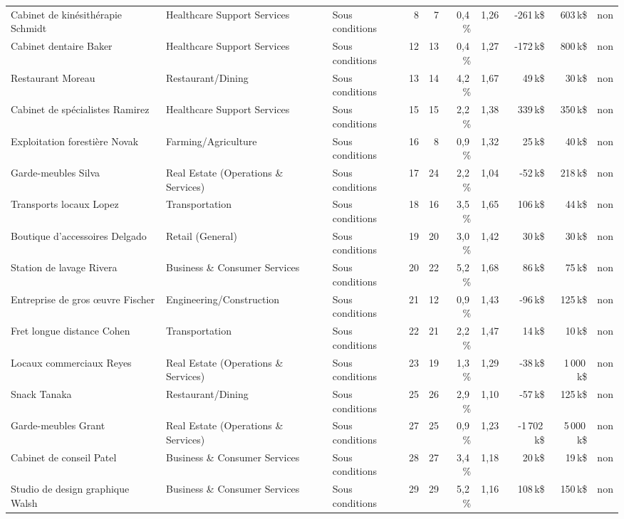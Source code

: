 {\begin{longtable}{p{3.7cm}p{2.5cm}lrrrrrrl}
Cabinet de kinésithérapie Schmidt & Healthcare Support Services & Sous conditions & 8 & 7 & 0,4\,\% & 1,26 & -261\,k\$ & 603\,k\$ & non \\
Cabinet dentaire Baker & Healthcare Support Services & Sous conditions & 12 & 13 & 0,4\,\% & 1,27 & -172\,k\$ & 800\,k\$ & non \\
Restaurant Moreau & Restaurant/Dining & Sous conditions & 13 & 14 & 4,2\,\% & 1,67 & 49\,k\$ & 30\,k\$ & non \\
Cabinet de spécialistes Ramirez & Healthcare Support Services & Sous conditions & 15 & 15 & 2,2\,\% & 1,38 & 339\,k\$ & 350\,k\$ & non \\
Exploitation forestière Novak & Farming/Agriculture & Sous conditions & 16 & 8 & 0,9\,\% & 1,32 & 25\,k\$ & 40\,k\$ & non \\
Garde-meubles Silva & Real Estate (Operations \& Services) & Sous conditions & 17 & 24 & 2,2\,\% & 1,04 & -52\,k\$ & 218\,k\$ & non \\
Transports locaux Lopez & Transportation & Sous conditions & 18 & 16 & 3,5\,\% & 1,65 & 106\,k\$ & 44\,k\$ & non \\
Boutique d'accessoires Delgado & Retail (General) & Sous conditions & 19 & 20 & 3,0\,\% & 1,42 & 30\,k\$ & 30\,k\$ & non \\
Station de lavage Rivera & Business \& Consumer Services & Sous conditions & 20 & 22 & 5,2\,\% & 1,68 & 86\,k\$ & 75\,k\$ & non \\
Entreprise de gros œuvre Fischer & Engineering/Construction & Sous conditions & 21 & 12 & 0,9\,\% & 1,43 & -96\,k\$ & 125\,k\$ & non \\
Fret longue distance Cohen & Transportation & Sous conditions & 22 & 21 & 2,2\,\% & 1,47 & 14\,k\$ & 10\,k\$ & non \\
Locaux commerciaux Reyes & Real Estate (Operations \& Services) & Sous conditions & 23 & 19 & 1,3\,\% & 1,29 & -38\,k\$ & 1\,000\,k\$ & non \\
Snack Tanaka & Restaurant/Dining & Sous conditions & 25 & 26 & 2,9\,\% & 1,10 & -57\,k\$ & 125\,k\$ & non \\
Garde-meubles Grant & Real Estate (Operations \& Services) & Sous conditions & 27 & 25 & 0,9\,\% & 1,23 & -1\,702\,k\$ & 5\,000\,k\$ & non \\
Cabinet de conseil Patel & Business \& Consumer Services & Sous conditions & 28 & 27 & 3,4\,\% & 1,18 & 20\,k\$ & 19\,k\$ & non \\
Studio de design graphique Walsh & Business \& Consumer Services & Sous conditions & 29 & 29 & 5,2\,\% & 1,16 & 108\,k\$ & 150\,k\$ & non \\

\end{longtable}}
